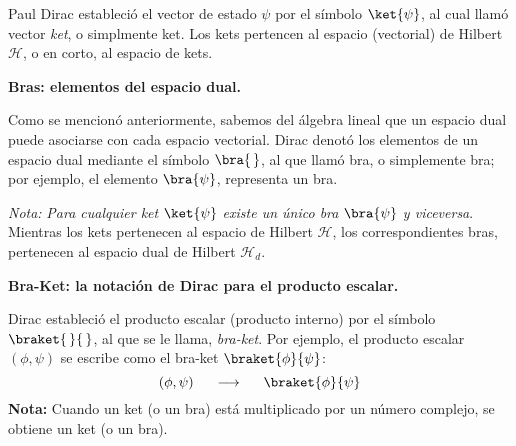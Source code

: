 Paul Dirac estableció el vector de estado $\psi$ por el símbolo $\ket{\psi}$, al cual llamó vector \emph{ket}, o simplmente ket. Los kets pertencen al espacio (vectorial) de Hilbert $\mathcal{H}$, o en corto, al espacio de kets.
\par
\textbf{Bras: elementos del espacio dual.}

Como se mencionó anteriormente, sabemos del álgebra lineal que un espacio dual puede asociarse con cada espacio vectorial. Dirac denotó los elementos de un espacio dual mediante el símbolo $\bra{ \, }$, al que llamó bra, o simplemente bra; por ejemplo, el elemento $\bra{\psi}$, representa un bra.
\par
\textit{Nota: } \emph{Para cualquier ket $\ket{\psi}$ existe un único bra $\bra{\psi}$ y viceversa}. Mientras los kets pertenecen al espacio de Hilbert $\mathcal{H}$, los correspondientes bras, pertenecen al espacio dual de Hilbert $\mathcal{H}_{d}$.
\par
\textbf{Bra-Ket: la notación de Dirac para el producto escalar.}

Dirac estableció el producto escalar (producto interno) por el símbolo $\braket{\,}{\,}$, al que se le llama, \emph{bra-ket}. Por ejemplo, el producto escalar $(\phi, \psi)$ se escribe como el bra-ket $\braket{\phi}{\psi}$:
\begin{equation}
(\phi, \psi) \hspace{0.5cm} \longrightarrow \hspace{0.5cm} \braket{\phi}{\psi}
\label{eq:ecuacion_02_24}
\end{equation}
\textbf{Nota: } Cuando un ket (o un bra) está multiplicado por un número complejo, se obtiene un ket (o un bra).

